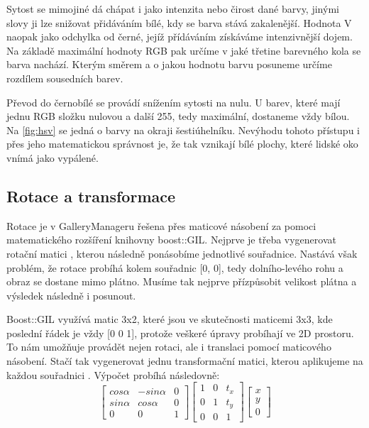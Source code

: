 \documentclass[11pt,twoside,a4paper]{book}
\begin{document}
\indent
Sytost se mimojiné dá chápat i jako intenzita nebo čirost dané barvy, jinými slovy ji lze snižovat přidáváním bílé, kdy se barva stává zakalenější. Hodnota V naopak jako odchylka od černé, jejíž přídáváním získáváme intenzivnější dojem. Na základě maximální hodnoty RGB pak určíme v jaké třetine barevného kola se barva nachází. Kterým směrem a o jakou hodnotu barvu posuneme určíme rozdílem sousedních barev.

\indent
Převod do černobílé se provádí snížením sytosti na nulu. U barev, které mají jednu RGB složku nulovou a další 255, tedy maximální, dostaneme vždy bílou. Na \ref{fig:hsv} se jedná o barvy na okraji šestiúhelníku. Nevýhodu tohoto přístupu i přes jeho matematickou správnost je, že tak vznikají bílé plochy, které lidské oko vnímá jako vypálené.

\subsection{Rotace a transformace}
\indent
Rotace je v GalleryManageru řešena přes maticové násobení za pomoci matematického rozšíření knihovny boost::GIL. Nejprve je třeba vygenerovat rotační matici \cite{wiki:rotation}, kterou následně ponásobíme jednotlivé souřadnice. Nastává však problém, že rotace probíhá kolem souřadnic [0, 0], tedy dolního-levého rohu a obraz se dostane mimo plátno. Musíme tak nejprve přízpůsobit velikost plátna a výsledek následně i posunout.

\indent
Boost::GIL využívá matic 3x2, které jsou ve skutečnosti maticemi 3x3, kde poslední řádek je vždy [0 0 1], protože veškeré úpravy probíhají ve 2D prostoru. To nám umožňuje provádět nejen rotaci, ale i translaci pomocí maticového násobení. Stačí tak vygenerovat jednu transformační matici, kterou aplikujeme na každou souřadnici \cite{wiki:affine}. Výpočet probíhá následovně:
$$
\begin{bmatrix}
cos\alpha & -sin\alpha & 0 \\
sin\alpha & cos\alpha & 0 \\
0 & 0 & 1
\end{bmatrix}
\begin{bmatrix}
1 & 0 & t_{x} \\
0 & 1 & t_{y} \\
0 & 0 & 1
\end{bmatrix}
\begin{bmatrix}
x \\
y \\
0
\end{bmatrix}
$$
\end{document}
